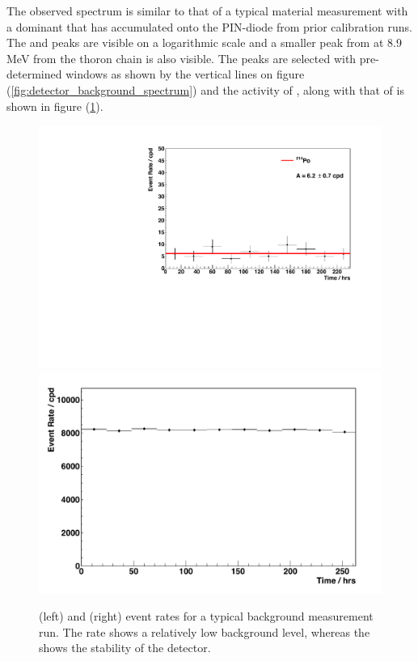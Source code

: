 The observed spectrum is similar to that of a typical material measurement with a dominant \PoTOZ{} that has accumulated onto the PIN-diode from prior calibration runs. The \PoTOE{} and \PoTOF{} peaks are visible on a logarithmic scale and a smaller peak from \PoTOT{} at 8.9 MeV from the thoron chain is also visible. The peaks are selected with pre-determined windows as shown by the vertical lines on figure (\ref{fig:detector_background_spectrum}) and the activity of \PoTOF{}, along with that of \PoTOZ{} is shown in figure (\ref{fig:detector_background_rates}). 
%
\begin{figure}[t!]
    \centering
    \includegraphics[scale=0.43]{Chapter_4/Figures/det_background/Po214_det_background.pdf}
    \includegraphics[scale=0.43]{Chapter_4/Figures/det_background/Po210_det_background.pdf}
    \caption[\PoTOF{} (left) and \PoTOZ{} (right) event rates for a typical background measurement run. The \PoTOF{} shows a relatively low background level, whereas the \PoTOZ{} shows the stability of the detector.]
    {\PoTOF{} (left) and \PoTOZ{} (right) event rates for a typical background measurement run. The \PoTOF{} rate shows a relatively low background level, whereas the \PoTOZ{} shows the stability of the detector.}
    \label{fig:detector_background_rates}
\end{figure}
%


